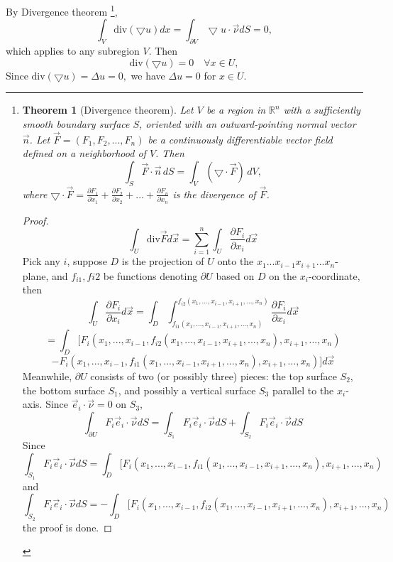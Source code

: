 \documentclass[a4paper,12pt]{report}
\newtheorem{theorem}{Theorem}[section]
\begin{document}
By Divergence theorem \footnote{
\begin{theorem}[Divergence theorem]
Let \( V \) be a region in \( \mathbb{R}^n \) with a sufficiently smooth boundary surface \( S \), oriented with an outward-pointing normal vector \( \vec{n} \). Let \( \vec{F} = (F_1, F_2, ...,  F_n) \) be a continuously differentiable vector field defined on a neighborhood of \( V \). Then
\[
\int_{S} \vec{F} \cdot \vec{n} \, dS = \int_{V} (\bigtriangledown \cdot \vec{F}) \, dV,
\]
where \( \bigtriangledown \cdot \vec{F} = \frac{\partial F_1}{\partial x_1} + \frac{\partial F_2}{\partial x_2} + ... + \frac{\partial F_n}{\partial x_n} \) is the divergence of \( \vec{F} \).
\end{theorem}
\begin{proof}
\[\int_{U} \text{div} \vec{F} d\vec{x} = \sum_{i = 1}^n \int_{U} \frac{\partial F_i}{\partial x_i} d\vec{x} \]
Pick any \(i\), suppose \(D\) is the projection of \(U\) onto the \(x_1 ... x_{i-1} x_{i+1} ... x_n\)-plane, and \(f_{i1}, f{i2}\) be functions denoting \(\partial U\) based on \(D\) on the \(x_i\)-coordinate, then \[\int_{U} \frac{\partial F_i}{\partial x_i} d\vec{x} = \int_{D} \int_{f_{i1}(x_1, ..., x_{i-1}, x_{i+1}, ..., x_n)}^{f_{i2}(x_1, ..., x_{i-1}, x_{i+1}, ..., x_n)} \frac{\partial F_i}{\partial x_i} d\vec{x} \]
\[= \int_{D} [F_i (x_1, ..., x_{i-1},f_{i2}(x_1, ..., x_{i-1}, x_{i+1}, ..., x_n), x_{i+1}, ..., x_n)\]
\[- F_i (x_1, ..., x_{i-1},f_{i1}(x_1, ..., x_{i-1}, x_{i+1}, ..., x_n), x_{i+1}, ..., x_n)] d\vec{x}\] 
Meanwhile, \(\partial U\) consists of two (or possibly three) pieces: the top surface \(S_2\), the bottom surface \(S_1\), and possibly a vertical surface \(S_3\) parallel to the \(x_i\)-axis. Since \(\vec{e}_i \cdot \vec{\nu} = 0\) on \(S_3\), 
\[\int_{\partial U} F_i \vec{e}_i \cdot \vec{\nu} dS = \int_{S_1} F_i \vec{e}_i \cdot \vec{\nu} dS + \int_{S_2} F_i \vec{e}_i \cdot \vec{\nu} dS\]
Since
\[\int_{S_1} F_i \vec{e}_i \cdot \vec{\nu} dS = \int_{D} [F_i (x_1, ..., x_{i-1},f_{i1}(x_1, ..., x_{i-1}, x_{i+1}, ..., x_n), x_{i+1}, ..., x_n) \]
and 
\[\int_{S_2} F_i \vec{e}_i \cdot \vec{\nu} dS = -\int_{D} [F_i (x_1, ..., x_{i-1},f_{i2}(x_1, ..., x_{i-1}, x_{i+1}, ..., x_n), x_{i+1}, ..., x_n) \]
the proof is done. 
\end{proof}
}, 
\[\int_{V} \text{div} (\bigtriangledown u) dx = \int_{\partial V} \bigtriangledown u \cdot \vec{\nu} dS = 0,\]
which applies to any subregion \(V\). Then 
\[\text{div} (\bigtriangledown u)=0 \quad \forall x \in U,\]
Since \(\text{div}(\bigtriangledown u) =\Delta u=0, \) we have \(\Delta u = 0\) for \(x \in U\). 
\end{document}

